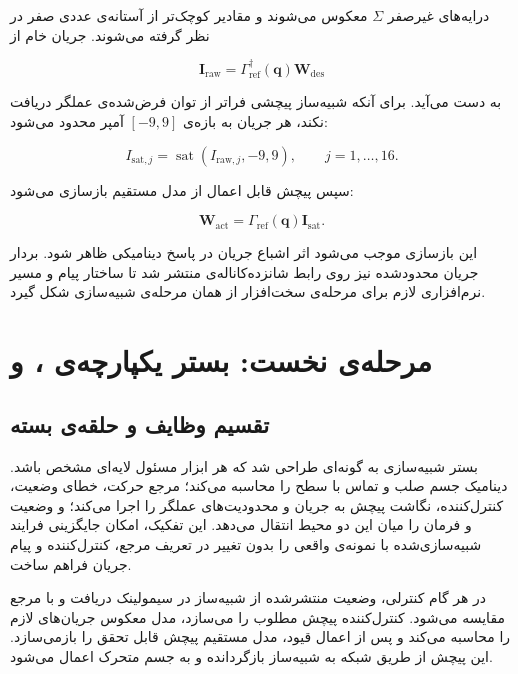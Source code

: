 درایه‌های غیرصفر $\Sigma$ معکوس می‌شوند و مقادیر کوچک‌تر از آستانه‌ی عددی صفر در نظر گرفته می‌شوند. جریان خام از

\begin{equation}
	\mathbf I_{\mathrm{raw}}=\Gamma_{\mathrm{ref}}^{\dagger}(\mathbf q)\mathbf W_{\mathrm{des}}
	\label{eq:method-raw-current}
\end{equation}

به دست می‌آید. برای آنکه شبیه‌ساز پیچشی فراتر از توان فرض‌شده‌ی عملگر دریافت نکند، هر جریان به بازه‌ی $[-9,9]$ آمپر محدود می‌شود:

\begin{equation}
	I_{\mathrm{sat},j}=\operatorname{sat}(I_{\mathrm{raw},j},-9,9),\qquad j=1,\ldots,16.
	\label{eq:method-current-saturation}
\end{equation}

سپس پیچش قابل اعمال از مدل مستقیم بازسازی می‌شود:

\begin{equation}
	\mathbf W_{\mathrm{act}}=\Gamma_{\mathrm{ref}}(\mathbf q)\mathbf I_{\mathrm{sat}}.
	\label{eq:method-actual-wrench}
\end{equation}

این بازسازی موجب می‌شود اثر اشباع جریان در پاسخ دینامیکی ظاهر شود. بردار جریان محدودشده نیز روی رابط شانزده‌کاناله‌ی  منتشر شد تا ساختار پیام و مسیر نرم‌افزاری لازم برای مرحله‌ی سخت‌افزار از همان مرحله‌ی شبیه‌سازی شکل گیرد.

\section{مرحله‌ی نخست: بستر یکپارچه‌ی ،  و }
\label{sec:method-sim-env}

\subsection{تقسیم وظایف و حلقه‌ی بسته}

بستر شبیه‌سازی به گونه‌ای طراحی شد که هر ابزار مسئول لایه‌ای مشخص باشد.  دینامیک جسم صلب و تماس با سطح را محاسبه می‌کند؛  مرجع حرکت، خطای وضعیت، کنترل‌کننده، نگاشت پیچش به جریان و محدودیت‌های عملگر را اجرا می‌کند؛ و  وضعیت و فرمان را میان این دو محیط انتقال می‌دهد. این تفکیک، امکان جایگزینی فرایند شبیه‌سازی‌شده با نمونه‌ی واقعی را بدون تغییر در تعریف مرجع، کنترل‌کننده و پیام جریان فراهم ساخت.

در هر گام کنترلی، وضعیت منتشرشده از شبیه‌ساز در سیمولینک دریافت و با مرجع مقایسه می‌شود. کنترل‌کننده پیچش مطلوب را می‌سازد، مدل معکوس جریان‌های لازم را محاسبه می‌کند و پس از اعمال قیود، مدل مستقیم پیچش قابل تحقق را بازمی‌سازد. این پیچش از طریق شبکه به شبیه‌ساز بازگردانده و به جسم متحرک اعمال می‌شود.

